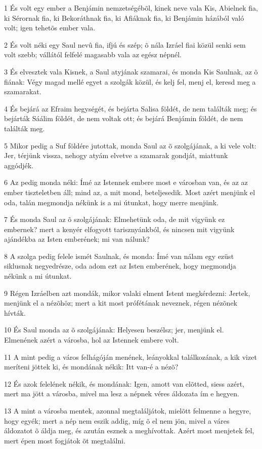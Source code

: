 \par 1 És volt egy ember a Benjámin nemzetségébõl, kinek neve vala Kis, Abielnek fia, ki Sérornak fia, ki Bekoráthnak fia, ki Afiáknak fia, ki Benjámin házából való volt; igen tehetõs ember vala.
\par 2 És volt néki egy Saul nevû fia, ifjú és szép; õ nála Izráel fiai közül senki sem volt szebb; vállától felfelé magasabb vala az egész népnél.
\par 3 És elvesztek vala Kisnek, a Saul atyjának szamarai, és monda Kis Saulnak, az õ fiának: Végy magad mellé egyet a szolgák közül, és kelj fel, menj el, keresd meg a szamarakat.
\par 4 És bejárá az Efraim hegységét, és bejárta Salisa földét, de nem találták meg; és bejárták Sáálim földét, de nem voltak ott; és bejárá Benjámin földét, de nem találták meg.
\par 5 Mikor pedig a Suf földére jutottak, monda Saul az õ szolgájának, a ki vele volt: Jer, térjünk vissza, nehogy atyám elvetve a szamarak gondját, miattunk aggódjék.
\par 6 Az pedig monda néki: Ímé az Istennek embere most e városban van, és az az ember tiszteletben áll; mind az, a mit mond, beteljesedik. Most azért menjünk el oda, talán megmondja nékünk is a mi útunkat, hogy merre menjünk.
\par 7 És monda Saul az õ szolgájának: Elmehetünk oda, de mit vigyünk ez embernek? mert a kenyér elfogyott tarisznyánkból, és nincsen mit vigyünk ajándékba az Isten emberének; mi van nálunk?
\par 8 A szolga pedig felele ismét Saulnak, és monda: Ímé van nálam egy ezüst siklusnak negyedrésze, oda adom ezt az Isten emberének, hogy megmondja nékünk a mi útunkat.
\par 9 Régen Izráelben azt mondák, mikor valaki elment Istent megkérdezni: Jertek, menjünk el a nézõhöz; mert a kit most prófétának neveznek, régen nézõnek hívták.
\par 10 És Saul monda az õ szolgájának: Helyesen beszélsz; jer, menjünk el. Elmenének azért a városba, hol az Istennek embere volt.
\par 11 A mint pedig a város felhágóján menének, leányokkal találkozának, a kik vizet meríteni jöttek ki, és mondának nékik: Itt van-é a nézõ?
\par 12 És azok felelének nékik, és mondának: Igen, amott van elõtted, siess azért, mert ma jött a városba, mivel ma lesz a népnek véres áldozata ím e hegyen.
\par 13 A mint a városba mentek, azonnal megtaláljátok, mielõtt felmenne a hegyre, hogy egyék; mert a nép nem eszik addig, míg õ el nem jön, mivel a váres áldozatot õ áldja meg, és azután esznek a meghívottak. Azért most menjetek fel, mert épen most fogjátok õt megtalálni.
